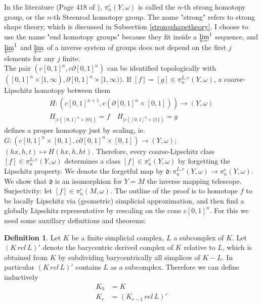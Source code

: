 \documentclass[a4paper,11pt]{article}
\theoremstyle{definition}
\newtheorem{definition}{Definition}[section]
\theoremstyle{plain}
\theoremstyle{remark}
\begin{document}
{In the literature (Page $418$ of \cite{geoghegan2007topological}), $\pi_n^e(Y,\omega)$ is called the $n$-th strong homotopy group, or the $n$-th Steenrod homotopy group. The name "strong" refers to strong shape theory, which is discussed in Subsection \ref{strongshapetheory}. I choose to use the name "end homotopy groups" because they fit inside a $\varprojlim^1$ sequence, and $\varprojlim^1$ and $\varprojlim$ of a inverse system of groups does not depend on the first $j$  elements for any $j$ finite. \\


The pair $(c[0,1]^n, c\partial [0,1]^n)$ can be identified topologically with $([0,1]^n \times [1,\infty), \partial [0,1]^n \times [1,\infty))$.  If $[f]=[g]\in \pi_{n}^{L,e}(Y,\omega)$, a coarse-Lipschitz homotopy between them
\begin{align*}
H:(c[0,1]^{n+1},c(\partial[0,1]^n \times [0,1]))\rightarrow (Y,\omega)\\
H_{|c([0,1]^n\times \{0\})}=f \quad H_{|c([0,1]^n\times \{1\})}= g
\end{align*}
defines a proper homotopy just by scaling, ie. $G: (c[0,1]^n \times [0,1], c\partial[0,1]^n \times [0,1]) \rightarrow (Y,\omega)$; $(hx,h,t)\mapsto H(hx,h,ht)$. Therefore, every coarse-Lipschitz class $[f]\in \pi_n^{L,e}(Y,\omega)$ determines a class $[f]\in\pi^e_{n}(Y,\omega)$ by forgetting the Lipschitz property. We denote the forgetful map by $\mathfrak{d}:  \pi_n^{L,e}(Y,\omega)\rightarrow \pi^e_{n}(Y,\omega)$. We show that $\mathfrak{d}$ is an isomorphism for $Y=M$ the inverse mapping telescope.\\


Surjectivity: let $[f]\in \pi_{n}^{e}(M,\omega)$. The outline of the proof is to homotope $f$ to be locally Lipschitz via (geometric) simplicial approximation, and then find a globally Lipschitz representative by rescaling on the cone $c[0,1]^n$. For this we need some auxillary definitions and theorems: 

\begin{definition} \label{derivedcomplex} Let $K$ be a finite simplicial complex, $L$ a subcomplex of $K$. Let $(K \,rel \,L)'$ denote the barycentric derived complex of $K$ relative to $L$, which is obtained from $K$ by subdividing barycentrically all simplices of $K-L$. In particular $(K \,rel \,L)'$ contains $L$ as a subcomplex. Therefore we can define inductively 
\begin{align*}
K_0 &= K\\
K_r &= (K_{r-1} \,rel \,L)'
\end{align*}
\end{definition}

}
\end{document}
